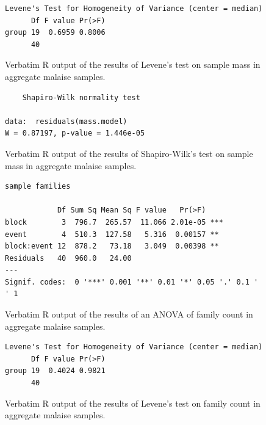 \documentclass[10pt,letterpaper,twocolumn]{article}
\begin{document}
\begin{figure}[h]
	\lstset{numbers=left}
	\lstset{xleftmargin=5mm,framexleftmargin=5mm}
	\begin{lstlisting}
Levene's Test for Homogeneity of Variance (center = median)
      Df F value Pr(>F)
group 19  0.6959 0.8006
      40               
	\end{lstlisting}
	\caption{Verbatim R output of the results of Levene's test on sample mass in aggregate malaise samples.}
	\label{fig:bulk_malaise_mass_levene}
	\smallskip
	\nointerlineskip
	\hrulefill
\end{figure}

\begin{figure}[h]
	\lstset{numbers=left}
	\lstset{xleftmargin=5mm,framexleftmargin=5mm}
	\begin{lstlisting}
	Shapiro-Wilk normality test

data:  residuals(mass.model)
W = 0.87197, p-value = 1.446e-05
	\end{lstlisting}
	\caption{Verbatim R output of the results of Shapiro-Wilk's test on sample mass in aggregate malaise samples.}
	\label{fig:bulk_malaise_mass_shapiro}
	\smallskip
	\nointerlineskip
	\hrulefill
\end{figure}

\begin{figure}[h]
	\lstset{numbers=left}
	\lstset{xleftmargin=5mm,framexleftmargin=5mm}
	\begin{lstlisting}
sample families 

            Df Sum Sq Mean Sq F value   Pr(>F)    
block        3  796.7  265.57  11.066 2.01e-05 ***
event        4  510.3  127.58   5.316  0.00157 ** 
block:event 12  878.2   73.18   3.049  0.00398 ** 
Residuals   40  960.0   24.00                     
---
Signif. codes:  0 '***' 0.001 '**' 0.01 '*' 0.05 '.' 0.1 ' ' 1
	\end{lstlisting}
	\caption{Verbatim R output of the results of an ANOVA of family count in aggregate malaise samples.}
	\label{fig:bulk_malaise_family_anova}
	\smallskip
	\nointerlineskip
	\hrulefill
\end{figure}

\begin{figure}[h]
	\lstset{numbers=left}
	\lstset{xleftmargin=5mm,framexleftmargin=5mm}
	\begin{lstlisting}
Levene's Test for Homogeneity of Variance (center = median)
      Df F value Pr(>F)
group 19  0.4024 0.9821
      40               
	\end{lstlisting}
	\caption{Verbatim R output of the results of Levene's test on family count in aggregate malaise samples.}
	\label{fig:bulk_malaise_family_levene}
	\smallskip
	\nointerlineskip
	\hrulefill
\end{figure}
\end{document}

